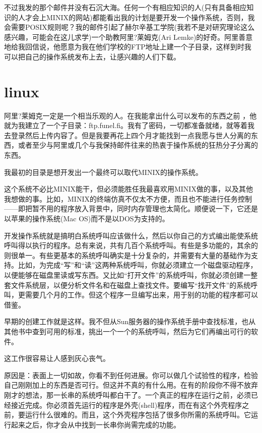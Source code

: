 不过我发的那个邮件并没有石沉大海。任何一个有相应知识的人(只有具备相应知识的人才会上MINIX的网站)都能看出我的计划是要开发一个操作系统，否则，我会需要POSIX规则呢？我的邮件引起了赫尔辛基工学院(我若不是对研究理论这么感兴趣，可能会在这儿求学)一个助教阿里?莱姆克(Ari Lemke)的好奇。阿里善意地给我回信说，他愿意为我在他们学校的FTP地址上建一个子目录，这样到时我可以把自己的操作系统发布上去，让感兴趣的人们下载。

 
\section{linux}

阿里?莱姆克一定是一个相当乐观的人。在我能拿出什么可以发布的东西之前 ，他就为我建立了一个子目录：ftp.funel.fi。我有了密码，一切都准备就绪，就等着我去登录然后上传内容了。但是我要再花上四个月才能找到一点我愿与世人分离的东西，或者至少与阿里或几个与我保持邮件往来的热衷于操作系统的狂热分子分离的东西。

我最初的目录是想开发出一个最终可以取代MINIX的操作系统。

这个系统不必比MINIX能干，但必须能胜任我最喜欢用MINIX做的事，以及其他我想做的事。比如，MINIX的终端仿真不仅太不方便，而且也不能进行任务控制——即把暂不用的程序放入背景中，同时内存管理也太简化。顺便说一下，它还是以苹果的操作系统(Mac OS)而不是以DOS为支持的。

开发操作系统就是搞明白系统呼叫应该做什么，然后以你自己的方式编出能使系统呼叫得以执行的程序。总有来说，共有几百个系统呼叫。有些是多功能的，其余的则很单一。有些更基本的系统呼叫确实是十分复杂的，并需要有大量的基础作为支持。比如，为完成“写”和“读”这两种系统呼叫，你就必须建立一个磁盘驱动程序，以便能够在磁盘里读或写东西。又比如“打开文件”的系统呼叫，你就必须创建一整套文件系统层，以便分析文件名和在磁盘上查找文件。要编写“找开文件”的系统呼叫，更需要几个月的工作。但这个程序一旦编写出来，用于别的功能的程序都可以借鉴。

早期的创建工作就是这样。我不但从Sun服务器的操作系统手册中查找标准，也从其他书中查到可用的标准，挑出一个一个的系统呼叫，然后为它们再编出可行的软件。

这工作很容易让人感到灰心丧气。

原因是：表面上一切如故，你看不到任何进展。你可以做几个试验性的程序，检验自己刚刚加上的东西是否可行。但这并不真的有什么用。在有的阶段你不得不放弃刚才的想法，那一长串的系统呼叫都白干了。一个真正的程序在运行之前，必须已经接近完成。你必须首先运行的程序是外壳(shell)程序，而在有这个外壳程序之前，要运行什么很难的。而且，这个外壳程序包括了很多你所需的系统呼叫。它运行起来之后，你才会从中找到一长串你尚需完成的功能。

